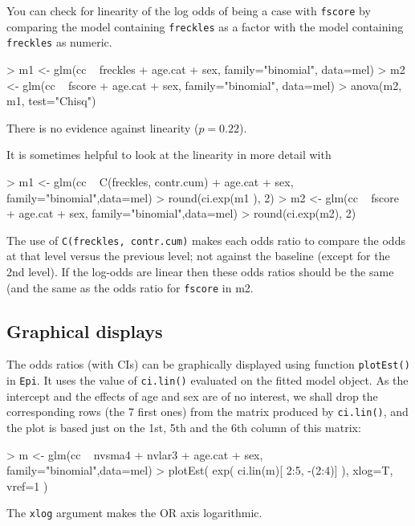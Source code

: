 You can check for linearity of the log odds of being a case with {\tt fscore} by comparing the model containing {\tt freckles} as a factor with the model containing {\tt freckles} as numeric.
\begin{Schunk}
\begin{Sinput}
> m1 <- glm(cc ~ freckles + age.cat + sex, family="binomial", data=mel)
> m2 <- glm(cc ~ fscore + age.cat + sex, family="binomial", data=mel)
> anova(m2, m1, test="Chisq")
\end{Sinput}
\end{Schunk}
There is no evidence against linearity ($p=0.22$).

It is sometimes helpful to look at the linearity in more detail with
\begin{Schunk}
\begin{Sinput}
> m1 <- glm(cc ~ C(freckles, contr.cum) + age.cat + sex, family="binomial",data=mel)
> round(ci.exp(m1 ), 2)
> m2 <- glm(cc ~ fscore + age.cat + sex, family="binomial",data=mel)
> round(ci.exp(m2), 2)
\end{Sinput}
\end{Schunk}
The use of {\tt C(freckles, contr.cum)} makes each odds ratio to compare the odds at that
 level versus the previous level; not against the baseline (except for the 2nd level). 
If the log-odds are linear then these odds ratios should be the same
 (and the same as the odds ratio for {\tt fscore} in m2.

\subsection{Graphical displays}
   
  The odds ratios (with CIs) can be graphically displayed using
  function {\tt plotEst()} in {\tt Epi}. It uses the value
 of {\tt ci.lin()} evaluated on the  fitted model object.
 As the intercept and the effects of age and sex are of
 no interest, we shall drop the corresponding rows (the 7 first ones)
 from the matrix produced by {\tt ci.lin()}, and
  the plot is based just on the 1st, 5th and the 6th column
 of this matrix:

\begin{Schunk}
\begin{Sinput}
> m <- glm(cc ~ nvsma4 + nvlar3 + age.cat + sex, family="binomial",data=mel)
> plotEst( exp( ci.lin(m)[ 2:5, -(2:4)] ), xlog=T, vref=1 )
\end{Sinput}
\end{Schunk}
The {\tt xlog} argument makes the OR axis logarithmic.



